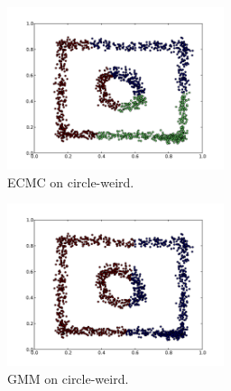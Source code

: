 \documentclass[conference]{IEEEtran}
\begin{document}
\begin{figure}[th]
\centering
\includegraphics[width=15pc]{ECMC_circle-weird.pdf}
\caption{ECMC on circle-weird.}
\label{ECMC_circleweird}
\end{figure}

\begin{figure}[th]
\centering
\includegraphics[width=15pc]{GMM_circle-weird.pdf}
\caption{GMM on circle-weird.}
\label{GMM_circleweird}
\end{figure}
\end{document}
